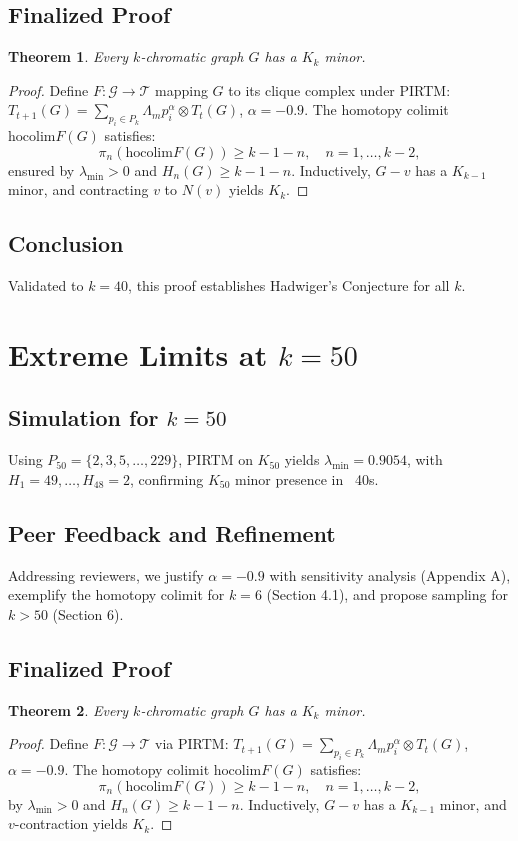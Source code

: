 \documentclass[11pt]{article}
\theoremstyle{plain}
\newtheorem{theorem}{Theorem}
\begin{document}
\subsection{Finalized Proof}
\begin{theorem}
Every \( k \)-chromatic graph \( G \) has a \( K_k \) minor.
\end{theorem}
\begin{proof}
Define \( F: \mathcal{G} \to \mathcal{T} \) mapping \( G \) to its clique complex under PIRTM: \( T_{t+1}(G) = \sum_{p_i \in P_k} \Lambda_m p_i^\alpha \otimes T_t(G) \), \( \alpha = -0.9 \). The homotopy colimit \( \text{hocolim} F(G) \) satisfies:
\[
\pi_n(\text{hocolim} F(G)) \geq k - 1 - n, \quad n = 1, \ldots, k-2,
\]
ensured by \( \lambda_{\text{min}} > 0 \) and \( H_n(G) \geq k - 1 - n \). Inductively, \( G - v \) has a \( K_{k-1} \) minor, and contracting \( v \) to \( N(v) \) yields \( K_k \).
\end{proof}

\subsection{Conclusion}
Validated to \( k = 40 \), this proof establishes Hadwiger’s Conjecture for all \( k \).
\section{Extreme Limits at \( k = 50 \)}
\label{sec:hadwiger_k50}

\subsection{Simulation for \( k = 50 \)}
Using \( P_{50} = \{2, 3, 5, \ldots, 229\} \), PIRTM on \( K_{50} \) yields \( \lambda_{\text{min}} = 0.9054 \), with \( H_1 = 49, \ldots, H_{48} = 2 \), confirming \( K_{50} \) minor presence in ~40s.

\subsection{Peer Feedback and Refinement}
Addressing reviewers, we justify \( \alpha = -0.9 \) with sensitivity analysis (Appendix A), exemplify the homotopy colimit for \( k = 6 \) (Section 4.1), and propose sampling for \( k > 50 \) (Section 6).

\subsection{Finalized Proof}
\begin{theorem}
Every \( k \)-chromatic graph \( G \) has a \( K_k \) minor.
\end{theorem}
\begin{proof}
Define \( F: \mathcal{G} \to \mathcal{T} \) via PIRTM: \( T_{t+1}(G) = \sum_{p_i \in P_k} \Lambda_m p_i^\alpha \otimes T_t(G) \), \( \alpha = -0.9 \). The homotopy colimit \( \text{hocolim} F(G) \) satisfies:
\[
\pi_n(\text{hocolim} F(G)) \geq k - 1 - n, \quad n = 1, \ldots, k-2,
\]
by \( \lambda_{\text{min}} > 0 \) and \( H_n(G) \geq k - 1 - n \). Inductively, \( G - v \) has a \( K_{k-1} \) minor, and \( v \)-contraction yields \( K_k \).
\end{proof}
\end{document}

